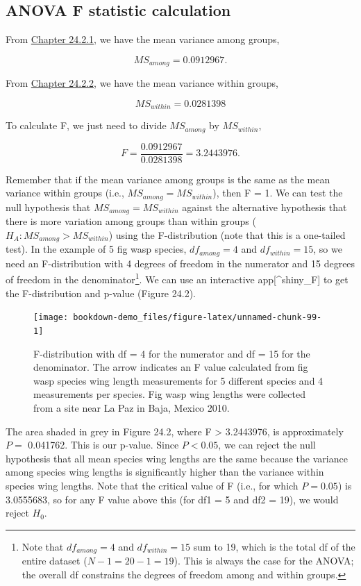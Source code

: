 \documentclass[
  openany]{krantz}
\begin{document}
\hypertarget{anova-f-statistic-calculation}{%
\subsection{ANOVA F statistic calculation}\label{anova-f-statistic-calculation}}

From \protect\hyperlink{anova-mean-variance-among-groups}{Chapter 24.2.1}, we have the mean variance among groups,

\[MS_{among} = 0.0912967.\]

From \protect\hyperlink{anova-mean-variance-among-groups}{Chapter 24.2.2}, we have the mean variance within groups,

\[MS_{within} = 0.0281398\]

To calculate F, we just need to divide \(MS_{among}\) by \(MS_{within}\),

\[F = \frac{0.0912967}{0.0281398} = 3.2443976.\]

Remember that if the mean variance among groups is the same as the mean variance within groups (i.e., \(MS_{among} = MS_{within}\)), then F = 1.
We can test the null hypothesis that \(MS_{among} = MS_{within}\) against the alternative hypothesis that there is more variation among groups than within groups (\(H_{A}: MS_{among} > MS_{within}\)) using the F-distribution (note that this is a one-tailed test).
In the example of 5 fig wasp species, \(df_{among} = 4\) and \(df_{within} = 15\),
so we need an F-distribution with 4 degrees of freedom in the numerator and 15 degrees of freedom in the denominator\footnote{Note that \(df_{among} = 4\) and \(df_{within} = 15\) sum to 19, which is the total df of the entire dataset (\(N - 1 = 20 - 1 = 19\)). This is always the case for the ANOVA; the overall df constrains the degrees of freedom among and within groups.}.
We can use an interactive app{[}\^{}shiny\_F{]} to get the F-distribution and p-value (Figure 24.2).

\begin{figure}
\texttt{[image: bookdown-demo\_files/figure-latex/unnamed-chunk-99-1]} \caption{F-distribution with df = 4 for the numerator and df = 15 for the denominator. The arrow indicates an F value calculated from fig wasp species wing length measurements for 5 different species and 4 measurements per species. Fig wasp wing lengths were collected from a site near La Paz in Baja, Mexico 2010.}\label{fig:unnamed-chunk-99}
\end{figure}

The area shaded in grey in Figure 24.2, where F \textgreater{} 3.2443976, is approximately \(P =\) 0.041762.
This is our p-value.
Since \(P < 0.05\), we can reject the null hypothesis that all mean species wing lengths are the same because the variance among species wing lengths is significantly higher than the variance within species wing lengths.
Note that the critical value of F (i.e., for which \(P = 0.05\)) is 3.0555683, so for any F value above this (for df1 = 5 and df2 = 19), we would reject \(H_{0}\).
\end{document}
